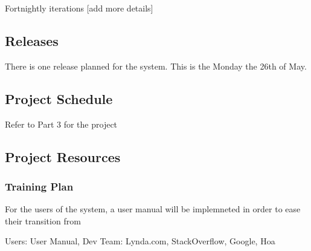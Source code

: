 Fortnightly iterations [add more details]



\subsection{Releases}

There is one release planned for the system. This is the Monday the 26th of May.


\subsection{Project Schedule}

Refer to Part 3 for the project 


\subsection{Project Resources}



\subsubsection{Training Plan}

For the users of the system, a user manual will be implemneted in order to ease their transition from

	Users: User Manual, Dev Team: Lynda.com, StackOverflow, Google, Hoa


